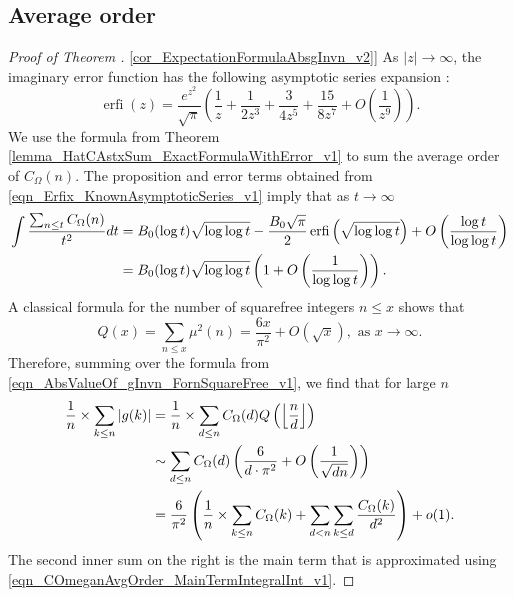 \documentclass[11pt,reqno,a4letter]{article}
\newcommand{\hlocalref}[1]{\hyperref[#1]{\ref{#1}}}
\numberwithin{equation}{section}
\numberwithin{figure}{section}
\numberwithin{table}{section}
\newcommand{\seqnum}[1]{\href{http://oeis.org/#1}{\color{ProcessBlue}{\underline{#1}}}}
\newcommand{\Floor}[2]{\ensuremath{\left\lfloor \frac{#1}{#2} \right\rfloor}}
\theoremstyle{plain}
\numberwithin{theorem}{section}
\theoremstyle{definition}
\begin{document}
\subsection{Average order} 

\begin{proof}[Proof of Theorem \hlocalref{cor_ExpectationFormulaAbsgInvn_v2}]  
As $|z| \rightarrow \infty$, the imaginary error function 
has the following asymptotic series expansion \cite[\S 7.12]{NISTHB}: 
\begin{equation}
\label{eqn_Erfix_KnownAsymptoticSeries_v1}
\operatorname{erfi}(z) = 
     \frac{e^{z^2}}{\sqrt{\pi}} \left(\frac{1}{z} + \frac{1}{2z^3} + 
     \frac{3}{4z^5} + \frac{15}{8z^7} + O\left(\frac{1}{z^{9}}\right)\right). 
\end{equation}
We use the formula from Theorem \hlocalref{lemma_HatCAstxSum_ExactFormulaWithError_v1} 
to sum the average order of $C_{\Omega}(n)$.
The proposition and error terms obtained from \eqref{eqn_Erfix_KnownAsymptoticSeries_v1} 
imply that as $t \rightarrow \infty$ 
\begin{align} 
\notag 
\int \frac{\sum_{n \leq t} C_{\Omega}(n)}{t^2} dt & = 
     B_0 (\log t) \sqrt{\log\log t} - \frac{B_0\sqrt{\pi}}{2} 
     \operatorname{erfi}\left(\sqrt{\log\log t}\right) + 
     O\left(\frac{\log t}{\log\log t}\right) \\ 
\label{eqn_COmeganAvgOrder_MainTermIntegralInt_v1} 
     & = 
     B_0 (\log t) \sqrt{\log\log t} \left(1 + O\left(\frac{1}{\log\log t}\right)\right). 
\end{align} 
A classical formula for the number of squarefree integers $n \leq x$ shows that 
\cite[\S 18.6]{HARDYWRIGHT} \cite[\seqnum{A013928}]{OEIS} 
\[ 
Q(x) = \sum_{n \leq x} \mu^2(n) = \frac{6x}{\pi^2} + O\left(\sqrt{x}\right), 
     \text{\ as $x \rightarrow \infty$}. 
\]
Therefore, summing over the formula from 
\eqref{eqn_AbsValueOf_gInvn_FornSquareFree_v1}, we find that for large $n$  
\begin{align} 
\notag 
\frac{1}{n} \times \sum_{k \leq n} |g(k)| & = \frac{1}{n} \times \sum_{d \leq n} 
     C_{\Omega}(d) Q\left(\Floor{n}{d}\right) \\ 
\notag 
     & \sim \sum_{d \leq n} C_{\Omega}(d) \left(\frac{6}{d \cdot \pi^2} + O\left(\frac{1}{\sqrt{dn}}\right) 
     \right) \\ 
\notag 
     & = \frac{6}{\pi^2} \left(\frac{1}{n} \times \sum_{k \leq n} C_{\Omega}(k) + \sum_{d<n} 
     \sum_{k \leq d} \frac{C_{\Omega}(k)}{d^2}\right) + o(1). 
\end{align} 
The second inner sum on the right is the main term that is approximated using 
\eqref{eqn_COmeganAvgOrder_MainTermIntegralInt_v1}. 
\end{proof} 
\end{document}
